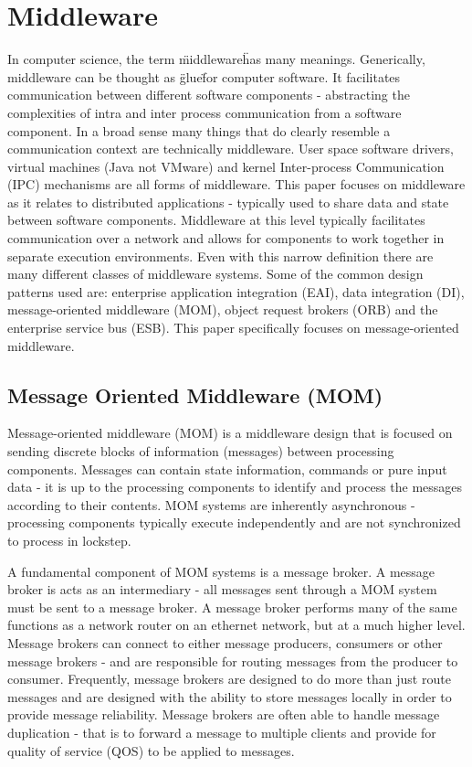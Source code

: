 \documentclass{thesis}
\begin{document}
\section{Middleware}
In computer science, the term \"middleware\" has many meanings.  Generically, middleware can be thought as \"glue\"  for computer software.  It facilitates communication between different software components - abstracting the complexities of intra and inter process communication from a software component.  In a broad sense many things that do clearly resemble a communication context are technically middleware.  User space software drivers, virtual machines (Java not VMware) and kernel Inter-process Communication (IPC) mechanisms are all forms of middleware.  This paper focuses on middleware as it relates to distributed applications - typically used to share data and state between software components.  Middleware at this level typically facilitates communication over a network and allows for components to work together in separate execution environments.  Even with this narrow definition there are many different classes of middleware systems.  Some of the common design patterns used are: enterprise application integration (EAI), data integration (DI), message-oriented middleware (MOM), object request brokers (ORB) and the enterprise service bus (ESB).  This paper specifically focuses on message-oriented middleware. 

\subsection{Message Oriented Middleware (MOM)}
Message-oriented middleware (MOM) is a middleware design that is focused on sending discrete blocks of information (messages) between processing components.  Messages can contain state information, commands or pure input data - it is up to the processing components to identify and process the messages according to their contents.  MOM systems are inherently asynchronous - processing components typically execute independently and are not synchronized to process in lockstep.

A fundamental component of MOM systems is a message broker.  A message broker is acts as an intermediary - all messages sent through a MOM system must be sent to a message broker.  A message broker performs many of the same functions as a network router on an ethernet network, but at a much higher level.  Message brokers can connect to either message producers, consumers or other message brokers - and are responsible for routing messages from the producer to consumer.  Frequently, message brokers are designed to do more than just route messages and are designed with the ability to store messages locally in order to provide message reliability.  Message brokers are often able to handle message duplication - that is to forward a message to multiple clients and provide for quality of service (QOS) to be applied to messages.  
\end{document}
